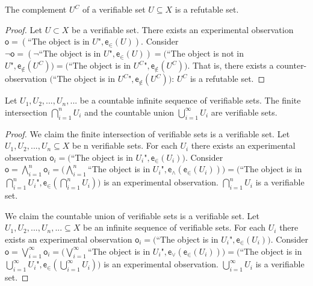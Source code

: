 \documentclass[11pt,letterpaper,fleqn]{memoir} %
\begin{document}
\begin{prop}
	The complement $U^C$ of a verifiable set $U \subseteq X$ is a refutable set.
\end{prop}

\begin{proof}
	Let $U\subset X$ be a verifiable set. There exists an experimental observation $\mathsf{o} = (\text{``The object is in } U \text{"}, \mathsf{e}_\in(U))$. Consider $\neg \mathsf{o} = (\neg \text{``The object is in } U \text{"}, \mathsf{e}_\in(U)) = ($``The object  is not in $ U \text{"}, \mathsf{e}_{\notin}(U^C)) = ($``The object  is in $ U^C \text{"}, \mathsf{e}_{\notin}(U^C))$. That is, there exists a counter-observation $($``The object  is in $ U^C \text{"}, \mathsf{e}_{\notin}(U^C))$: $U^C$ is a refutable set.
\end{proof}

\begin{prop}
	Let $U_1, U_2, ... , U_n, ...$ be a countable infinite sequence of verifiable sets. The finite intersection $\bigcap\limits_{i=1}^{n} U_i$ and the countable union  $\bigcup\limits_{i=1}^{\infty} U_i$ are verifiable sets.
\end{prop}

\begin{proof}
	We claim the finite intersection of verifiable sets is a verifiable set. Let $U_1, U_2, ... , U_n \subseteq X$ be n verifiable sets. For each $U_i$ there exists an experimental observation $\mathsf{o}_i = ($``The object is in $ U_i \text{"}, \mathsf{e}_\in(U_i))$. Consider $\mathsf{o} = \bigwedge\limits_{i=1}^{n} \mathsf{o}_i = (\bigwedge\limits_{i=1}^{n} $``The object is in $ U_i \text{"}, \mathsf{e}_{\wedge}(\mathsf{e}_\in(U_i)))=( $``The object is in $ \bigcap\limits_{i=1}^{n} U_i \text{"}, \mathsf{e}_\in(\bigcap\limits_{i=1}^{n} U_i))$ is an experimental observation. $\bigcap\limits_{i=1}^{n} U_i$ is a verifiable set.
	
	We claim the countable union of verifiable sets is a verifiable set. Let $U_1, U_2, ... , U_n, ... \subseteq X$ be an infinite sequence of verifiable sets. For each $U_i$ there exists an experimental observation $\mathsf{o}_i = ($``The object is in $ U_i \text{"}, \mathsf{e}_\in(U_i))$. Consider $\mathsf{o} = \bigvee\limits_{i=1}^{\infty} \mathsf{o}_i = (\bigvee\limits_{i=1}^{\infty} $``The object is in $ U_i \text{"}, \mathsf{e}_{\vee}(\mathsf{e}_\in(U_i)))=( $``The object is in $ \bigcup\limits_{i=1}^{\infty} U_i \text{"}, \mathsf{e}_\in(\bigcup\limits_{i=1}^{\infty} U_i))$ is an experimental observation. $\bigcup\limits_{i=1}^{\infty} U_i$ is a verifiable set.
\end{proof}
\end{document}
